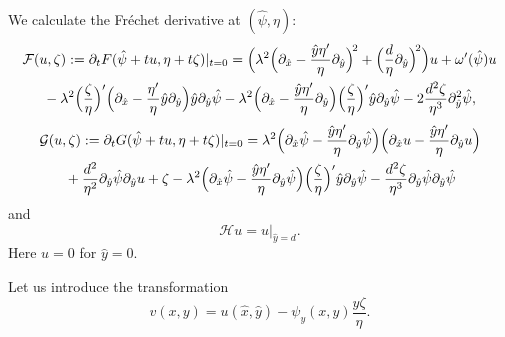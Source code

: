 \documentclass[oneside,a4paper,11pt]{article}
\theoremstyle{thmstyletwo}%
\theoremstyle{thmstylethree}%
\numberwithin{equation}{section}
\begin{document}
We calculate the Fr\'{e}chet derivative at $(\hat{\psi},\eta)$:
\begin{multline}\label{Ju28a}
\mathcal{F}(u,\zeta):=\partial_{t}F(\hat{\psi}+tu,\eta+t\zeta)|_{t=0}=\Bigl(\lambda^2\Bigl(\partial_{\hat{x}}-\frac{\hat{y}\eta'}{\eta}\partial_{\hat{y}}\Bigr)^{\!2}
+\Bigl(\frac{d}{\eta}\partial_{\hat{y}}\Bigr)^{\!2}\Bigr)u+\omega'(\hat{\psi})u\\
{}-\lambda^2\Bigl(\frac{\zeta}{\eta}\Bigr)'\Bigl(\partial_{\hat{x}}-\frac{\eta'}{\eta}{\hat{y}}\partial_{\hat{y}}\Bigr)\hat{y}\partial_{\hat{y}}\hat{\psi}
-\lambda^2\Bigl(\partial_{\hat{x}}-\frac{\hat{y}\eta'}{\eta}\partial_{\hat{y}}\Bigr)\Bigl(\frac{\zeta}{\eta}\Bigr)'\hat{y}\partial_{\hat{y}}\hat{\psi}
-2\frac{d^2\zeta}{\eta^3}\partial_{\hat{y}}^2\hat{\psi},
\end{multline}
\begin{multline}\label{Ju28aa}
\mathcal{G}(u,\zeta):=\partial_tG(\hat{\psi}+tu,\eta+t\zeta)|_{t=0}=\lambda^2\Bigl(\partial_{\hat{x}}\hat{\psi}-\frac{\hat{y}\eta'}{\eta}\partial_{\hat{y}}\hat{\psi}\Bigr)\Bigl(\partial_{\hat{x}}u
-\frac{\hat{y}\eta'}{\eta}\partial_{\hat{y}}u\Bigr)\\
{}+\frac{d^2}{\eta^2}\partial_{\hat{y}}\hat{\psi}\partial_{\hat{y}}u+\zeta
-\lambda^2\Bigl(\partial_{\hat{x}}\hat{\psi}-\frac{\hat{y}\eta'}{\eta}\partial_{\hat{y}}\hat{\psi}\Bigr)\Bigl(\frac{\zeta}{\eta}\Bigr)'\hat{y}\partial_{\hat{y}}\hat{\psi}
-\frac{d^2\zeta}{\eta^3}\partial_{\hat{y}}\hat{\psi}\partial_{\hat{y}}\hat{\psi}
\end{multline}
and
\begin{equation}\label{Ju28ab}
\mathcal{H}u=u|_{\hat{y}=d}.
\end{equation}
Here $u=0$ for $\hat{y}=0$.

Let us introduce the transformation
\begin{equation}\label{Au2a}
v(x,y)=u(\hat{x},\hat{y})-\psi_{y}(x,y)\frac{y\zeta}{\eta}.%
\end{equation}
\end{document}
